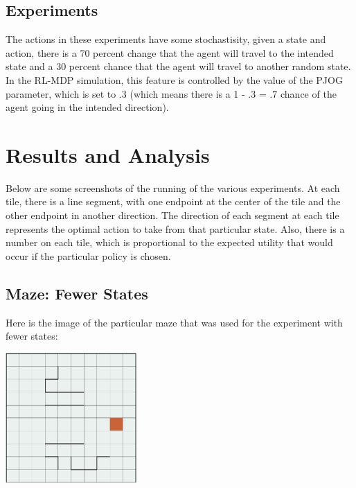 \documentclass[11pt]{article}
\begin{document}
            


            \subsection{Experiments}
            
            The actions in these experiments have some stochastisity, given a state and action, there is a 70 percent change
            that the agent will travel to the intended state and a 30 percent chance that the agent will travel to another
            random state. In the RL-MDP simulation, this feature is controlled by the value of the PJOG parameter,
            which is set to .3 (which means there is a 1 - .3 = .7
            chance of the agent going in the intended direction).

           
        \section{Results and Analysis}

        Below are some screenshots of the running of the various experiments.
        At each tile, there is a line segment, with one endpoint at the center
        of the tile and the other endpoint in another direction. The direction
        of each segment at each tile represents the optimal action to
        take from that particular state. Also, there is a number on each
        tile, which is proportional to the expected utility that would occur
        if the particular policy is chosen.

        \subsection{Maze: Fewer States}

            Here is the image of the particular maze that was used for the
            experiment with fewer states:

            \includegraphics[width=5cm]{../images/small/maze.PNG}
\end{document}
